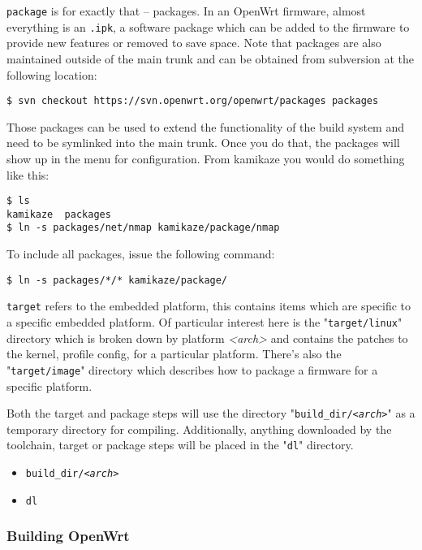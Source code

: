 \texttt{package} is for exactly that -- packages. In an OpenWrt firmware, almost everything
is an \texttt{.ipk}, a software package which can be added to the firmware to provide new
features or removed to save space. Note that packages are also maintained outside of the main
trunk and can be obtained from subversion at the following location:

\begin{Verbatim}
$ svn checkout https://svn.openwrt.org/openwrt/packages packages
\end{Verbatim}

Those packages can be used to extend the functionality of the build system and need to be
symlinked into the main trunk. Once you do that, the packages will show up in the menu for
configuration. From kamikaze you would do something like this:

\begin{Verbatim}
$ ls
kamikaze  packages
$ ln -s packages/net/nmap kamikaze/package/nmap
\end{Verbatim}

To include all packages, issue the following command:

\begin{Verbatim}
$ ln -s packages/*/* kamikaze/package/
\end{Verbatim}

\texttt{target} refers to the embedded platform, this contains items which are specific to
a specific embedded platform. Of particular interest here is the "\texttt{target/linux}"
directory which is broken down by platform \textit{<arch>} and contains the patches to the
kernel, profile config, for a particular platform. There's also the "\texttt{target/image}" directory
which describes how to package a firmware for a specific platform.

Both the target and package steps will use the directory "\texttt{build\_dir/\textit{<arch>}}"
as a temporary directory for compiling. Additionally, anything downloaded by the toolchain,
target or package steps will be placed in the "\texttt{dl}" directory.

\begin{itemize}
    \item \texttt{build\_dir/\textit{<arch>}}
    \item \texttt{dl}
\end{itemize}

\subsubsection{Building OpenWrt}

